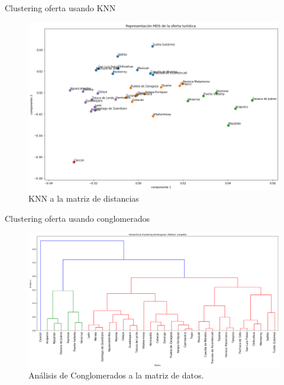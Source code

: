 \begin{frame}{Clustering oferta usando KNN}
    \begin{figure}
        \centering
        \includegraphics[scale=0.335]{figure/knn_oferta_c.png}
        \caption{KNN a la matriz de distancias}
        \label{fig:knn_oferta_c}
    \end{figure}
\end{frame}

\begin{frame}{Clustering oferta usando conglomerados}
    \begin{figure}
        \centering
        \includegraphics[scale=0.22]{figure/herarquico_oferta_c.png}
        \caption{Análisis de Conglomerados a la matriz de datos.}
        \label{fig:knn_oferta_c}
    \end{figure}
\end{frame}


